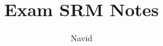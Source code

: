 \documentclass[12pt]{article}
\begin{document}
 
 
 
\title{Exam SRM Notes}%
\author{Navid} %
 
\maketitle
 





 
\end{document}
